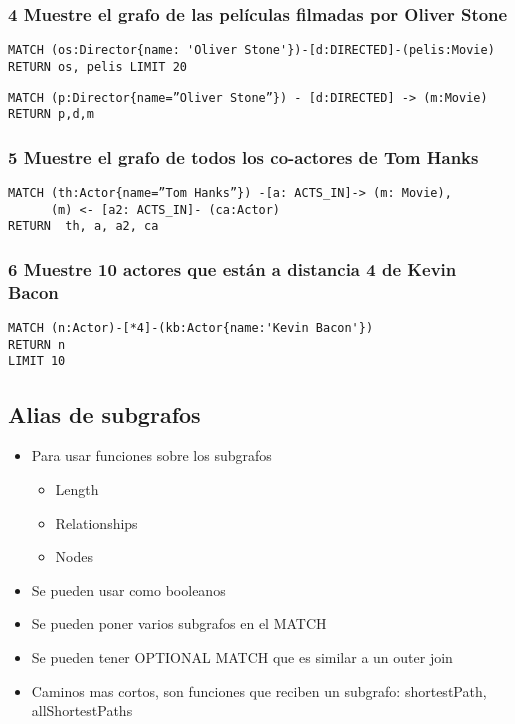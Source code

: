 \subsubsection*{4 Muestre el grafo de las películas filmadas por Oliver Stone}

\begin{verbatim}
MATCH (os:Director{name: 'Oliver Stone'})-[d:DIRECTED]-(pelis:Movie)
RETURN os, pelis LIMIT 20
\end{verbatim}

\begin{verbatim}
MATCH (p:Director{name=”Oliver Stone”}) - [d:DIRECTED] -> (m:Movie)
RETURN p,d,m
\end{verbatim}

\subsubsection*{5 Muestre el grafo de todos los co-actores de Tom Hanks}

\begin{verbatim}
MATCH (th:Actor{name=”Tom Hanks”}) -[a: ACTS_IN]-> (m: Movie),
	  (m) <- [a2: ACTS_IN]- (ca:Actor)
RETURN  th, a, a2, ca
\end{verbatim}


\subsubsection*{6 Muestre 10 actores que están a distancia 4 de Kevin Bacon}

\begin{verbatim}
MATCH (n:Actor)-[*4]-(kb:Actor{name:'Kevin Bacon'})
RETURN n
LIMIT 10
\end{verbatim}

\subsection*{Alias de subgrafos}

\begin{itemize}
\item Para usar funciones sobre los subgrafos
    \begin{itemize}
    \item Length
    \item Relationships
    \item Nodes
    \end{itemize}
\item Se pueden usar como booleanos
\item Se pueden poner varios subgrafos en el MATCH
\item Se pueden tener OPTIONAL MATCH que es similar a un outer join
\item Caminos mas cortos, son funciones que reciben un subgrafo: shortestPath, allShortestPaths
\end{itemize}


